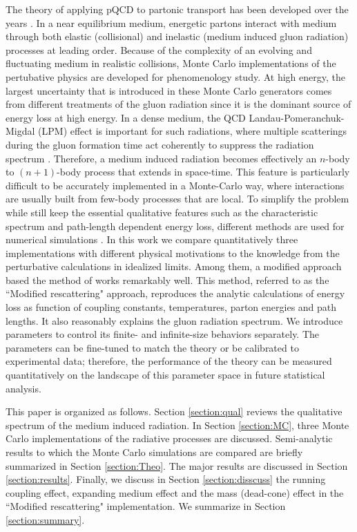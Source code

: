 \documentclass[aps, prc, reprint, amsmath, groupedaddress, nofootinbib]{revtex4-1}
\begin{document}
The theory of applying pQCD to partonic transport has been developed over the years \cite{Arnold:2002zm, Ghiglieri:2015ala}.
In a near equilibrium medium, energetic partons interact with medium through both elastic (collisional) and inelastic (medium induced gluon radiation) processes at leading order.
Because of the complexity of an evolving and fluctuating medium in realistic collisions, Monte Carlo implementations of the pertubative physics are developed for phenomenology study.
At high energy, the largest uncertainty that is introduced in these Monte Carlo generators comes from different treatments of the gluon radiation since it is the dominant source of energy loss at high energy.
In a dense medium, the QCD Landau-Pomeranchuk-Migdal (LPM) effect is important for such radiations, where multiple scatterings during the gluon formation time act coherently to suppress the radiation spectrum \cite{PhysRev.103.1811,Wang:1994fx,Zakharov:1996fv,Baier:1996kr}.
Therefore, a medium induced radiation becomes effectively an $n$-body to $(n+1)$-body process that extends in space-time.
This feature is particularly difficult to be accurately implemented in a Monte-Carlo way, where interactions are usually built from few-body processes that are local.
To simplify the problem while still keep the essential qualitative features such as the characteristic spectrum and path-length dependent energy loss, different methods are used for numerical simulations \cite{Djordjevic:2008iz,Cao:2013ita,ColemanSmith:2012vr,Xu:2004mz,Zapp:2011ya,Gossiaux:2012cv,Park:thesis}.
In this work we compare quantitatively three implementations with different physical motivations to the knowledge from the perturbative calculations in idealized limits.
Among them, a modified approach based the method of \cite{Zapp:2011ya} works remarkably well.
This method, referred to as the ``Modified rescattering" approach, reproduces the analytic calculations of energy loss as function of coupling constants, temperatures, parton energies and path lengths.
It also reasonably explains the gluon radiation spectrum.
We introduce parameters to control its finite- and infinite-size behaviors separately.
The parameters can be fine-tuned to match the theory or be calibrated to experimental data;
therefore, the performance of the theory can be measured quantitatively on the landscape of this parameter space in future statistical analysis.

This paper is organized as follows. Section \ref{section:qual} reviews the qualitative spectrum of the medium induced radiation.
In Section \ref{section:MC}, three Monte Carlo implementations of the radiative processes are discussed. 
Semi-analytic results to which the Monte Carlo simulations are compared are briefly summarized in Section \ref{section:Theo}.
The major results are discussed in Section \ref{section:results}.
Finally, we discuss in Section \ref{section:disscuss} the running coupling effect, expanding medium effect and the mass (dead-cone) effect in the ``Modified rescattering" implementation. We summarize in Section \ref{section:summary}.
\end{document}
